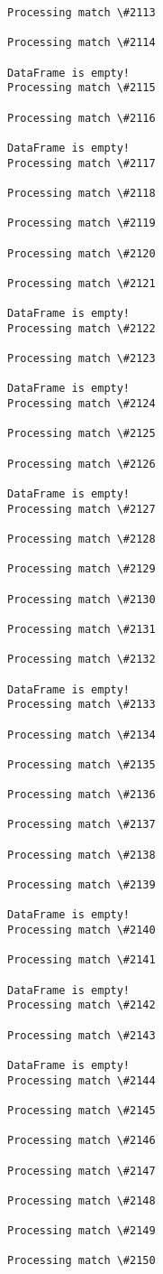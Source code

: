 \documentclass[11pt]{article}
\begin{document}
\begin{Verbatim}[commandchars=\\\{\}]
Processing match \#2113

Processing match \#2114

DataFrame is empty!
Processing match \#2115

Processing match \#2116

DataFrame is empty!
Processing match \#2117

Processing match \#2118

Processing match \#2119

Processing match \#2120

Processing match \#2121

DataFrame is empty!
Processing match \#2122

Processing match \#2123

DataFrame is empty!
Processing match \#2124

Processing match \#2125

Processing match \#2126

DataFrame is empty!
Processing match \#2127

Processing match \#2128

Processing match \#2129

Processing match \#2130

Processing match \#2131

Processing match \#2132

DataFrame is empty!
Processing match \#2133

Processing match \#2134

Processing match \#2135

Processing match \#2136

Processing match \#2137

Processing match \#2138

Processing match \#2139

DataFrame is empty!
Processing match \#2140

Processing match \#2141

DataFrame is empty!
Processing match \#2142

Processing match \#2143

DataFrame is empty!
Processing match \#2144

Processing match \#2145

Processing match \#2146

Processing match \#2147

Processing match \#2148

Processing match \#2149

Processing match \#2150


\end{Verbatim}
\end{document}
